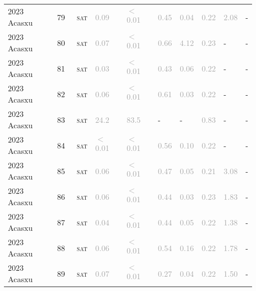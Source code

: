 \begin{center}
{\begin{longtable}{@{}llllllllll@{}}
2023 Acasxu & 79 & ~\textsc{sat} & \textcolor{darkgray}{0.09} & \textcolor{darkgray}{$<$0.01} & \textcolor{darkgray}{0.45} & \textcolor{darkgray}{0.04} & \textcolor{darkgray}{0.22} & \textcolor{darkgray}{2.08} & - \\
2023 Acasxu & 80 & ~\textsc{sat} & \textcolor{darkgray}{0.07} & \textcolor{darkgray}{$<$0.01} & \textcolor{darkgray}{0.66} & \textcolor{darkgray}{4.12} & \textcolor{darkgray}{0.23} & - & - \\
2023 Acasxu & 81 & ~\textsc{sat} & \textcolor{darkgray}{0.03} & \textcolor{darkgray}{$<$0.01} & \textcolor{darkgray}{0.43} & \textcolor{darkgray}{0.06} & \textcolor{darkgray}{0.22} & - & - \\
2023 Acasxu & 82 & ~\textsc{sat} & \textcolor{darkgray}{0.06} & \textcolor{darkgray}{$<$0.01} & \textcolor{darkgray}{0.61} & \textcolor{darkgray}{0.03} & \textcolor{darkgray}{0.22} & - & - \\
2023 Acasxu & 83 & ~\textsc{sat} & \textcolor{darkgray}{24.2} & \textcolor{darkgray}{83.5} & - & - & \textcolor{darkgray}{0.83} & - & - \\
2023 Acasxu & 84 & ~\textsc{sat} & \textcolor{darkgray}{$<$0.01} & \textcolor{darkgray}{$<$0.01} & \textcolor{darkgray}{0.56} & \textcolor{darkgray}{0.10} & \textcolor{darkgray}{0.22} & - & - \\
2023 Acasxu & 85 & ~\textsc{sat} & \textcolor{darkgray}{0.06} & \textcolor{darkgray}{$<$0.01} & \textcolor{darkgray}{0.47} & \textcolor{darkgray}{0.05} & \textcolor{darkgray}{0.21} & \textcolor{darkgray}{3.08} & - \\
2023 Acasxu & 86 & ~\textsc{sat} & \textcolor{darkgray}{0.06} & \textcolor{darkgray}{$<$0.01} & \textcolor{darkgray}{0.44} & \textcolor{darkgray}{0.03} & \textcolor{darkgray}{0.23} & \textcolor{darkgray}{1.83} & - \\
2023 Acasxu & 87 & ~\textsc{sat} & \textcolor{darkgray}{0.04} & \textcolor{darkgray}{$<$0.01} & \textcolor{darkgray}{0.44} & \textcolor{darkgray}{0.05} & \textcolor{darkgray}{0.22} & \textcolor{darkgray}{1.38} & - \\
2023 Acasxu & 88 & ~\textsc{sat} & \textcolor{darkgray}{0.06} & \textcolor{darkgray}{$<$0.01} & \textcolor{darkgray}{0.54} & \textcolor{darkgray}{0.16} & \textcolor{darkgray}{0.22} & \textcolor{darkgray}{1.78} & - \\
2023 Acasxu & 89 & ~\textsc{sat} & \textcolor{darkgray}{0.07} & \textcolor{darkgray}{$<$0.01} & \textcolor{darkgray}{0.27} & \textcolor{darkgray}{0.04} & \textcolor{darkgray}{0.22} & \textcolor{darkgray}{1.50} & - \\

\end{longtable}}
\end{center}
